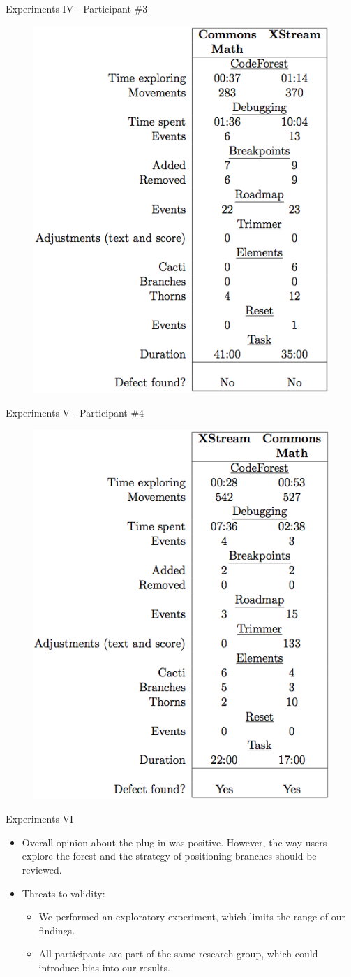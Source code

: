 \documentclass[handout]{beamer}
\begin{document}
\begin{frame}{Experiments IV - Participant \#3}
        \begin{figure}
            \includegraphics[width=.5\textwidth]{figures/experiment_2}
        \end{figure}
\end{frame}

\begin{frame}{Experiments V - Participant \#4}
        \begin{figure}
            \includegraphics[width=.5\textwidth]{figures/experiment_3}
        \end{figure}
\end{frame}

\begin{frame}{Experiments VI}
    \begin{itemize}
        \item Overall opinion about the plug-in was positive. However, the way
        users explore the forest and the strategy of positioning branches
        should be reviewed.
        \item Threats to validity:
            \begin{itemize}
                \item We performed an exploratory experiment, which limits the
                range of our findings.
                \item All participants are part of the same research group,
                which could introduce bias into our results.
            \end{itemize}
    \end{itemize}
\end{frame}
\end{document}
